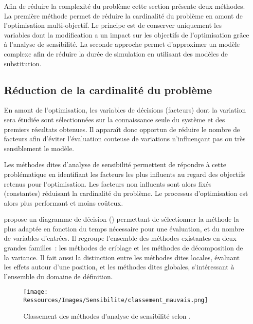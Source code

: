 Afin de réduire la complexité du problème cette section présente deux méthodes.
La première méthode permet de réduire la cardinalité du problème en amont de
l’optimisation multi-objectif. Le principe est de conserver uniquement les variables
dont la modification a un impact sur les objectifs de l’optimisation grâce à l’analyse de
sensibilité. La seconde approche permet d’approximer un modèle complexe afin de réduire la
durée de simulation en utilisant des modèles de substitution.


\subsection{Réduction de la cardinalité du problème} %
\label{sub:reduction_de_la_cardinalite_du_probleme}
En amont de l’optimisation, les variables de décisions (facteurs) dont la variation sera
étudiée sont sélectionnées sur la connaissance seule du système et des premiers résultats
obtenues. Il apparaît donc opportun de réduire le nombre de facteurs afin d’éviter
l’évaluation couteuse de variations n’influençant pas ou très sensiblement le modèle.

Les méthodes dites d’analyse de sensibilité permettent de répondre à cette problématique
en identifiant les facteurs les plus influents au regard des objectifs retenus pour
l’optimisation. Les facteurs non influents sont alors fixés (constantes) réduisant la
cardinalité du problème. Le processus d’optimisation est alors plus performant et moins
coûteux.

\textcite{Iooss2011} propose un diagramme de décision ()
permettant de sélectionner la méthode la plus adaptée en fonction du temps nécessaire pour
une évaluation, et du nombre de variables d’entrées. Il regroupe l’ensemble
des méthodes existantes en deux grandes familles~: les méthodes de criblage et les méthodes
de décomposition de la variance. Il fait aussi la distinction entre les
méthodes dites locales, évaluant les effets autour d’une position, et les méthodes
dites globales, s’intéressant à l’ensemble du domaine de définition.

\begin{figure}
    \centering
    \texttt{[image: Ressources/Images/Sensibilite/classement\_mauvais.png]}
    \caption{Classement des méthodes d’analyse de sensibilité selon \cite{Iooss2011}.}
    \label{fig:classement_methode_sensibilite}
\end{figure}

